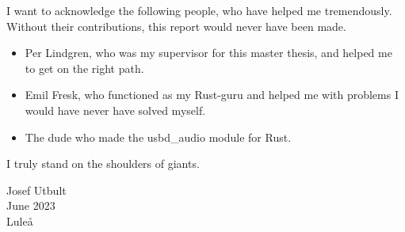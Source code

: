 I want to acknowledge the following people, who have helped me tremendously. 
Without their contributions, this report would never have been made.

\begin{itemize}
	\item Per Lindgren, who was my supervisor for this master thesis, and helped me to get on the right path.
	\item Emil Fresk, who functioned as my Rust-guru and helped me with problems I would have never have solved myself.
	\item The dude who made the usbd\_audio module for Rust. 
\end{itemize}

I truly stand on the shoulders of giants.

Josef Utbult \\
June 2023 \\
Luleå
